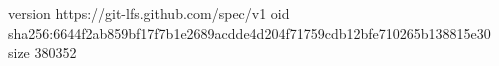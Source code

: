 version https://git-lfs.github.com/spec/v1
oid sha256:6644f2ab859bf17f7b1e2689acdde4d204f71759cdb12bfe710265b138815e30
size 380352
